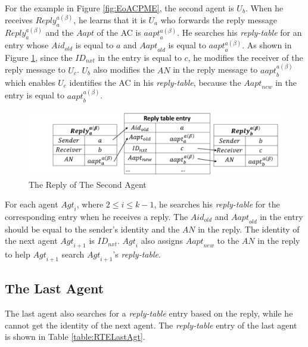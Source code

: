 For the example in Figure \ref{fig:EoACPME}, the second agent is $U_b$. When he receives ${Reply}^{a\left(\beta\right)}_a$, he learns that it is $U_a$ who forwards the reply message ${Reply}^{a\left(\beta\right)}_a$ and the $Aapt$ of the AC is ${aapt}^{a\left(\beta\right)}_a$. He searches his \textit{reply-table} for an entry whose ${Aid}_{old}$ is equal to $a$ and ${Aapt}_{old}$ is equal to ${aapt}^{a\left(\beta\right)}_a$. As shown in Figure \ref{fig:ReplyOfSecondAgent}, since the ${ID}_{nxt}$ in the entry is equal to $c$, he modifies the receiver of the reply message to $U_c$. $U_b$ also modifies the $AN$ in the reply message to ${aapt}^{a\left(\beta\right)}_b$ which enables $U_c$ identifies the AC in his \textit{reply-table}, because the ${Aapt}_{new}$ in the entry is equal to ${aapt}^{a\left(\beta\right)}_b$. 

\begin{figure} [H]
  \centering 
  \includegraphics[width=6.0in]{figures/FIG_4_8_The_Reply_of_the_Second_Agent.png}
  \caption{The Reply of The Second Agent} 
  \label{fig:ReplyOfSecondAgent} %
\end{figure}

For each agent ${Agt}_i$, where $2\le i\le k-1$, he searches his \textit{reply-table} for the corresponding entry when he receives a reply. The ${Aid}_{old}$ and ${Aapt}_{old}$ in the entry should be equal to the sender's identity and the $AN$ in the reply. The identity of the next agent ${Agt}_{i+1}$ is ${ID}_{nxt}$. ${Agt}_i$ also assigns ${Aapt}_{new}$ to the $AN$ in the reply to help ${Agt}_{i+1}$ search ${Agt}_{i+1}$'s \textit{reply-table}.

\subsection{ The Last Agent}

\noindent The last agent also searches for a \textit{reply-table} entry based on the reply, while he cannot get the identity of the next agent. The \textit{reply-table} entry of the last agent is shown in Table \ref{table:RTELastAgt}.

